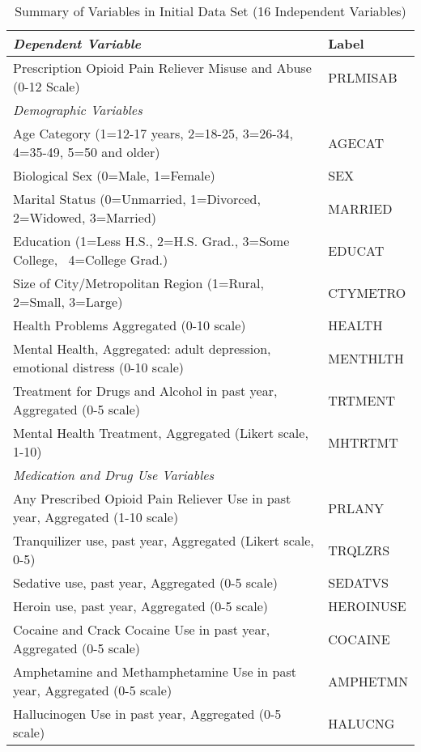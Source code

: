 \documentclass[sigconf]{acmart}
\begin{document}
\begin{table*}[ht]
  \caption{Summary of Variables in Initial Data Set (16 Independent Variables)}
  \label{tab:freq}
  \begin{tabular}{ll}
    \toprule
    \textit{Dependent Variable} & Label \\
    \midrule
    Prescription Opioid Pain Reliever Misuse and Abuse (0-12 Scale)& PRLMISAB  \\
    \midrule
    \textit{Demographic Variables}&   \\
    \midrule
    Age Category (1=12-17 years, 2=18-25, 3=26-34, 4=35-49, 5=50 and older)& AGECAT \\
    Biological Sex (0=Male, 1=Female)& SEX  \\
    Marital Status (0=Unmarried, 1=Divorced, 2=Widowed, 3=Married)& MARRIED  \\
    Education (1=Less H.S., 2=H.S. Grad., 3=Some College,  4=College Grad.)& EDUCAT  \\
    Size of City/Metropolitan Region (1=Rural, 2=Small, 3=Large)& CTYMETRO  \\
    Health Problems Aggregated  (0-10 scale)& HEALTH  \\
    Mental Health, Aggregated: adult depression, emotional distress (0-10 scale)& MENTHLTH  \\
    Treatment for Drugs and Alcohol in past year, Aggregated (0-5 scale)& TRTMENT  \\
    Mental Health Treatment, Aggregated (Likert scale, 1-10)& MHTRTMT  \\
    \midrule
    \textit{Medication and Drug Use Variables}& \\
    \midrule
    Any Prescribed Opioid Pain Reliever Use in past year, Aggregated (1-10 scale)& PRLANY  \\
    Tranquilizer use, past year, Aggregated (Likert scale, 0-5)& TRQLZRS \\
    Sedative use, past year, Aggregated (0-5 scale)& SEDATVS  \\
    Heroin use, past year, Aggregated (0-5 scale)& HEROINUSE  \\
    Cocaine and Crack Cocaine Use in past year, Aggregated  (0-5 scale)& COCAINE  \\
    Amphetamine and Methamphetamine Use in past year, Aggregated (0-5 scale)& AMPHETMN  \\
    Hallucinogen Use in past year, Aggregated (0-5 scale)& HALUCNG \\
    \bottomrule
  \end{tabular}
\end{table*}
\end{document}
